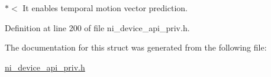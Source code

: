 $\ast$$<$ It enables temporal motion vector prediction. 

Definition at line 200 of file ni\+\_\+device\+\_\+api\+\_\+priv.\+h.



The documentation for this struct was generated from the following file\+:\begin{DoxyCompactItemize}
\item 
\mbox{\hyperlink{ni__device__api__priv_8h}{ni\+\_\+device\+\_\+api\+\_\+priv.\+h}}\end{DoxyCompactItemize}

